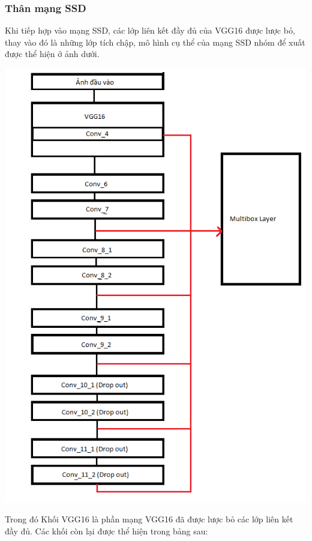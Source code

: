 \documentclass[a4paper,12pt]{article}
\begin{document}
	\subsubsection{Thân mạng SSD\cite{liu2016ssd}}
	
	Khi tiếp hợp vào mạng SSD\cite{liu2016ssd}, các lớp liên kết đầy đủ của VGG16\cite{simonyan2014very} được lược bỏ, thay vào đó là những lớp tích chập, mô hình cụ thể của mạng SSD\cite{liu2016ssd} nhóm để xuất được thể hiện ở ảnh dưới.
	
	\begin{center}
		
		\centering
		\includegraphics[width=0.8\linewidth]{SSD_Layers.png}
		\vspace{0.5cm}
	\end{center}
	
	Trong đó Khối VGG16 là phần mạng VGG16\cite{simonyan2014very} đã được lược bỏ các lớp liên kết đầy đủ. Các khối còn lại được thể hiện trong bảng sau:
	
\end{document}
